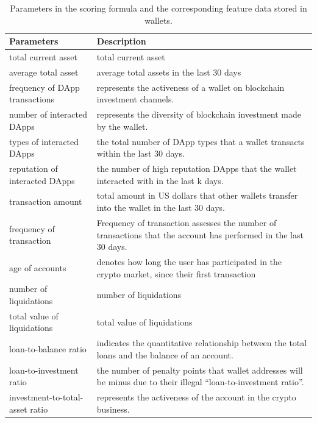 \documentclass[../ICIT-Paper-2024.tex]{subfiles}
\begin{document}
\begin{table}[htbp]
    \centering
    \caption{Parameters in the scoring formula and the corresponding feature data stored in wallets.}\label{tab1} %
    \begin{tabular}{|l|m{8cm}|} %
        \hline
        \textbf{Parameters} & \textbf{Description} \\ %
        \hline
        total current asset & total current asset \\ \hline
        average total asset & average total assets in the last 30 days \\ \hline
        frequency of DApp transactions & represents the activeness of a wallet on blockchain investment channels. \\ \hline
        number of interacted DApps & represents the diversity of blockchain investment made by the wallet. \\ \hline
        types of interacted DApps & the total number of DApp types that a wallet transacts within the last 30 days. \\ \hline
        reputation of interacted DApps & the number of high reputation DApps that the wallet interacted with in the last k days. \\ \hline
        transaction amount & total amount in US dollars that other wallets transfer into the wallet in the last 30 days. \\ \hline
        frequency of transaction & Frequency of transaction assesses the number of transactions that the account has performed in the last 30 days. \\ \hline
        age of accounts & denotes how long the user has participated in the crypto market, since their first transaction \\ \hline
        number of liquidations & number of liquidations \\ \hline
        total value of liquidations & total value of liquidations \\ \hline
        loan-to-balance ratio & indicates the quantitative relationship between the total loans and the balance of an account.  \\ \hline
        loan-to-investment ratio & the number of penalty points that wallet addresses will be minus due to their illegal “loan-to-investment ratio”. \\ \hline
        investment-to-total-asset ratio & represents the activeness of the account in the crypto business. \\ \hline
    \end{tabular}
    \label{tab:parameters} %
\end{table}
\end{document}
